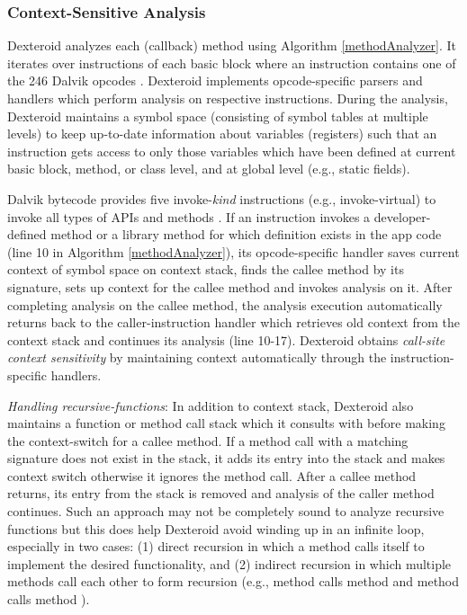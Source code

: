 \documentclass[10pt]{elsarticle}
\begin{document}
\subsubsection{Context-Sensitive Analysis} \label{secContextSensitive}

Dexteroid analyzes each (callback) method  using Algorithm \ref{methodAnalyzer}. It iterates over instructions of each basic block where an instruction contains one of the 246 Dalvik opcodes \cite{DalvikByteCode}. Dexteroid implements opcode-specific parsers and handlers which perform analysis on respective instructions. During the analysis, Dexteroid maintains a symbol space (consisting of symbol tables at multiple levels) to keep up-to-date information about variables (registers) such that an instruction gets access to only those variables which have been defined at current basic block, method, or class level, and at global level (e.g., static fields). 

Dalvik bytecode provides five {\ttfamily invoke-}\emph{kind} instructions (e.g., {\ttfamily invoke-virtual}) to invoke all types of APIs and methods \cite{DalvikByteCode}. If an instruction invokes a developer-defined method or a library method for which definition exists in the app code (line 10 in Algorithm \ref{methodAnalyzer}), its opcode-specific handler saves current context of symbol space on context stack, finds the callee method by its signature, sets up context for the callee method and invokes analysis on it. After completing analysis on the callee method, the analysis execution automatically returns back to the caller-instruction handler which retrieves old context from the context stack and continues its analysis (line 10-17). Dexteroid obtains \emph{call-site context sensitivity} by maintaining context automatically through the instruction-specific handlers. 

{\noindent \emph{Handling recursive-functions}:} In addition to context stack, Dexteroid also maintains a function or method call stack which it consults with before making the context-switch for a callee method. If a method call with a matching signature does not exist in the stack, it adds its entry into the stack and makes context switch otherwise it ignores the method call. After a callee method returns, its entry from the stack is removed and analysis of the caller method continues. Such an approach may not be completely sound to analyze recursive functions but this does help Dexteroid avoid winding up in an infinite loop, especially in two cases: (1) direct recursion in which a method calls itself to implement the desired functionality, and (2) indirect recursion in which multiple methods call each other to form recursion (e.g., method  calls method  and method  calls method ). 
\end{document}
